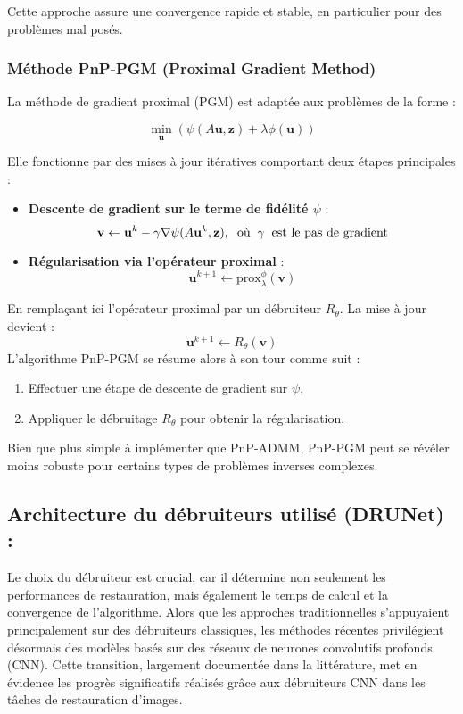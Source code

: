 \documentclass[a4paper, 12pt]{report} %
\begin{document}
Cette approche assure une convergence rapide et stable, en particulier pour des problèmes mal posés.

\subsubsection{Méthode PnP-PGM (Proximal Gradient Method)}

La méthode de gradient proximal (PGM) est adaptée aux problèmes de la forme :

\[
\min_{\mathbf{u}} \left( \psi(A\mathbf{u}, \mathbf{z}) + \lambda \phi(\mathbf{u}) \right)
\]

Elle fonctionne par des mises à jour itératives comportant deux étapes principales :

\begin{itemize}
    \item \textbf{Descente de gradient sur le terme de fidélité \( \psi \)} :
    \[
    \mathbf{v} \leftarrow \mathbf{u}^k - \gamma \nabla \psi(A\mathbf{u}^k, \mathbf{z}),
    \hspace{0.2 cm} \text{où} \hspace{0.2 cm}  \gamma \hspace{0.2 cm} \text{est le pas de gradient}
    \]
    \item \textbf{Régularisation via l’opérateur proximal} :
    \[
    \mathbf{u}^{k+1} \leftarrow \text{prox}_{\lambda}^{\phi}(\mathbf{v})
    \]
\end{itemize}
En remplaçant ici l'opérateur proximal par un débruiteur \( R_\theta \). La mise à jour devient :
\[
\mathbf{u}^{k+1} \leftarrow R_\theta(\mathbf{v})
\]
L’algorithme PnP-PGM se résume alors à son tour comme suit :
\begin{enumerate}
    \item Effectuer une étape de descente de gradient sur \( \psi \),
    \item Appliquer le débruitage \( R_\theta \) pour obtenir la régularisation.
\end{enumerate}

Bien que plus simple à implémenter que PnP-ADMM, PnP-PGM peut se révéler moins robuste pour certains types de problèmes inverses complexes.

\subsection{Architecture du débruiteurs utilisé (DRUNet) :}

Le choix du débruiteur est crucial, car il détermine non seulement les performances de restauration, mais également le temps de calcul et la convergence de l'algorithme. Alors que les approches traditionnelles s’appuyaient principalement sur des débruiteurs classiques, les méthodes récentes privilégient désormais des modèles basés sur des réseaux de neurones convolutifs profonds (CNN). Cette transition, largement documentée dans la littérature, met en évidence les progrès significatifs réalisés grâce aux débruiteurs CNN dans les tâches de restauration d’images.
\end{document}
